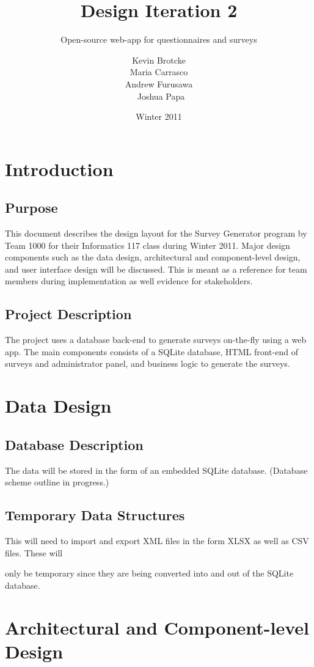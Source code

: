 \documentclass[a4paper,12pt,oneside]{report}
\title{Design Iteration 2}
\subtitle{Open-source web-app for questionnaires and surveys}
\date{Winter 2011}
\author{Kevin Brotcke\\
Maria Carrasco\\
Andrew Furusawa\\\
Joshua Papa }
\begin{document}
   
\renewcommand{\contentsname}{Contents}
\renewcommand{\bibname}{Bibliography}
\renewcommand{\caption}{{\bf Caption : }}

\raskolnikovmaketitle
\tableofcontents

\chapter{Introduction}

\section{ Purpose}

This document describes the design layout for the Survey Generator program by Team 1000 for their Informatics 117 class during Winter 2011. Major design components such as the data design, architectural and component-level design, and user interface design will be discussed. This is meant as a reference for team members during implementation as well evidence for stakeholders.
\section{ Project Description}

        The project uses a database back-end to generate surveys on-the-fly using a web app. The main components consists of a SQLite database, HTML front-end of surveys and administrator panel, and business logic to generate the surveys.
\chapter{ Data Design}
\section{ Database Description}

        The data will be stored in the form of an embedded SQLite database. (Database scheme outline in progress.)
\section{ Temporary Data Structures}

This will need to import and export XML files in the form XLSX as well as CSV files. These will

only be temporary since they are being converted into and out of the SQLite database.
\chapter{ Architectural and Component-level Design}
\end{document}
